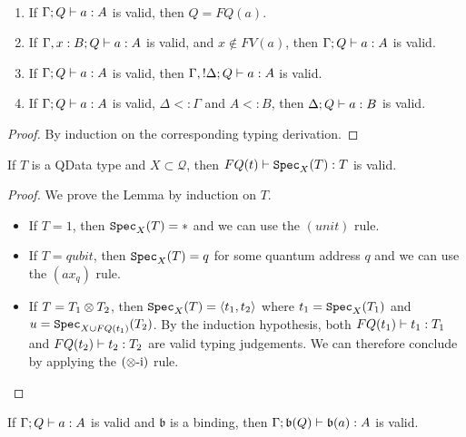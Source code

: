 \documentclass{article}
\begin{document}
\begin{lemma}~
\label{prop_type_syst}
\begin{enumerate}
  \item If $\Gamma; Q \vdash a:A$ is valid, 
  then $Q=FQ(a)$.\label{q_context}
  \item If $\Gamma,x:B;Q \vdash a:A$ is valid, 
  and $x\notin FV(a)$, then $\Gamma;Q \vdash a:A$ is valid.\label{unused_var}
  \item If $\Gamma; Q \vdash a:A$ is valid, 
  then $\Gamma, !\Delta ; Q \vdash a:A$ is valid.\label{weakening}
  \item If $\Gamma ; Q \vdash a:A$ is valid, $\Delta <: \Gamma$
  and $A<:B$, then $\Delta ; Q \vdash a:B$ is valid.\label{subtype}
\end{enumerate}
\end{lemma}

\begin{proof}
By induction on the corresponding typing derivation.
\end{proof}

\begin{lemma}
\label{specimen}
If $T$ is a QData type and $X\subset \mathcal{Q}$, then 
$FQ(t)\vdash \texttt{Spec}_X(T):T$ is valid.
\end{lemma}

\begin{proof}
We prove the Lemma by induction on $T$.
  \begin{itemize}
    \item If $T=1$, then $\texttt{Spec}_X(T)=*$ and we can use the $(unit)$ rule.
    \item If $T=qubit$, then $\texttt{Spec}_X(T)=q$ for some quantum address $q$ and we can 
          use the $(ax_q)$ rule.
    \item If $T=T_1\otimes T_2$, then $\texttt{Spec}_X(T)=\langle t_1,t_2\rangle$ where $t_1=\texttt{Spec}_X(T_1)$ 
          and $u=\texttt{Spec}_{X\cup FQ(t_1)}(T_2)$. By the induction hypothesis, both 
          $FQ(t_1)\vdash t_1:T_1$ and $FQ(t_2)\vdash t_2:T_2$ are valid typing 
          judgements. We can therefore conclude by applying the $(\otimes\mbox{-i})$ rule.
  \end{itemize}
\end{proof}

\begin{lemma}
\label{binding_judgement}
If $\Gamma;Q \vdash a:A$ is valid and $\mathfrak{b}$ is a 
binding, then $\Gamma;\mathfrak{b} (Q) \vdash \mathfrak{b}(a):A$ is valid.
\end{lemma}
\end{document}

